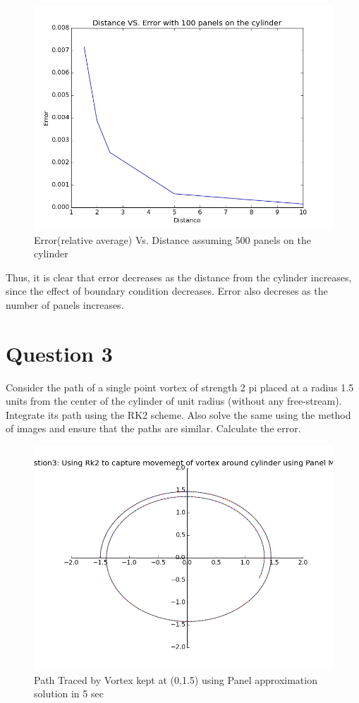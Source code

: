 \documentclass{article}
\begin{document}
\begin{figure}[H]  \label{figure}
\includegraphics[width=12cm]{result3.jpg}
\caption{Error(relative average) Vs. Distance assuming 500 panels on the cylinder}
\label{figure:}
\end{figure}

Thus, it is clear that error decreases as the distance from the cylinder increases, since the effect of boundary condition decreases.
Error also decreses as the number of panels increases. 

\newpage
\section*{Question 3}
Consider the path of a single point vortex of strength 2 pi placed at a radius 1.5 units from the center of the cylinder of unit radius (without any free-stream). Integrate its path using the RK2 scheme. Also solve the same using the method of images and ensure that the paths are similar. Calculate the error.
\begin{figure}[H] \label{figure}
\includegraphics[width=12cm]{q3_panel.png}
\caption{Path Traced by Vortex kept at (0,1.5) using Panel approximation solution in 5 sec}
\label{figure:}
\end{figure}
\end{document}
